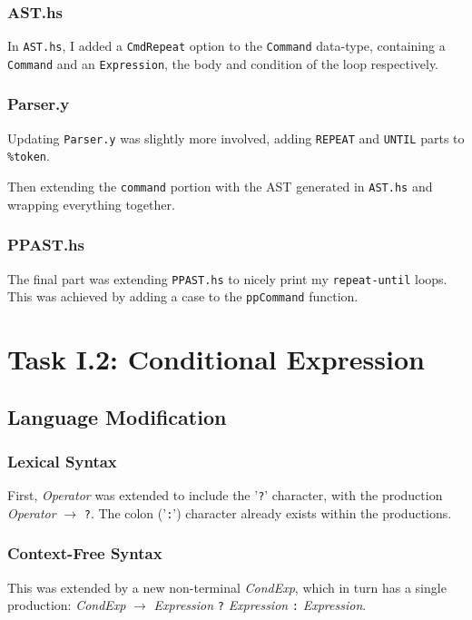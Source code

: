 \documentclass[12pt]{article}
\newcommand{\lstin}[3]{
  
}
\begin{document}
\lstin{153}{154}{Scanner.hs}

\subsubsection{AST.hs}
In \verb|AST.hs|, I added a \verb|CmdRepeat| option to the \verb|Command| data-type, containing a \verb|Command| and an \verb|Expression|, the body and condition of the loop respectively.

\lstin{118}{123}{AST.hs}

\subsubsection{Parser.y}
Updating \verb|Parser.y| was slightly more involved, adding \verb|REPEAT| and \verb|UNTIL| parts to \verb|%token|.

\lstin{72}{73}{Parser.y}

Then extending the \verb|command| portion with the AST generated in \verb|AST.hs| and wrapping everything together.

\lstin{130}{131}{Parser.y}

\subsubsection{PPAST.hs}
The final part was extending \verb|PPAST.hs| to nicely print my \verb|repeat-until| loops.
This was achieved by adding a case to the \verb|ppCommand| function.

\lstin{70}{73}{PPAST.hs}

\section{Task I.2: Conditional Expression}
\subsection{Language Modification}
\subsubsection{Lexical Syntax}
First, \textit{Operator} was extended to include the '\verb|?|' character, with the production \textit{Operator} $\rightarrow$ \verb|?|.
The colon ('\verb|:|') character already exists within the productions.

\subsubsection{Context-Free Syntax}
This was extended by a new non-terminal \textit{CondExp}, which in turn has a single production: \textit{CondExp} $\rightarrow$ \textit{Expression} \verb|?| \textit{Expression} \verb|:| \textit{Expression}.
\end{document}
